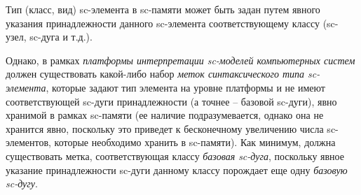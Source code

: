 Тип (класс, вид) sc-элемента в sc-памяти может быть задан путем явного указания принадлежности данного sc-элемента
соответствующему классу (sc-узел, sc-дуга и т.д.).

Однако, в рамках \textit{платформы интерпретации sc-моделей компьютерных систем} должен существовать какой-либо набор
\textit{меток синтаксического типа sc-элемента}, которые задают тип элемента на уровне платформы и не имеют соответствующей
sc-дуги принадлежности (а точнее -- базовой sc-дуги), явно хранимой в рамках sc-памяти (ее наличие подразумевается,
однако она не хранится явно, поскольку это приведет к бесконечному увеличению числа sc-элементов, которые необходимо
хранить в sc-памяти). Как минимум, должна существовать метка, соответствующая классу \textit{базовая sc-дуга}, поскольку
явное указание принадлежности sc-дуги данному классу порождает еще одну \textit{базовую sc-дугу}.

